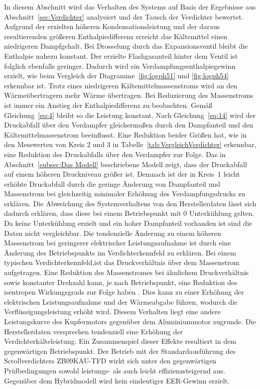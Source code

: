 In diesem Abschnitt wird das Verhalten des Systems auf Basis der Ergebnisse aus Abschnitt~\ref{sec:Verdichter} analysiert und der Tausch der Verdichter bewertet. 
Aufgrund der erzielten höheren Kondensationsleistung und der daraus resultierenden größeren Enthalpiedifferenz erreicht das Kältemittel einen niedrigeren Dampfgehalt. Bei Drosselung durch das Expansionsventil bleibt die Enthalpie nahezu konstant. Der erzielte Flashgasanteil hinter dem Ventil ist folglich ebenfalls geringer. Dadurch wird ein Verdampfungsenthalpiegewinn erzielt, wie beim Vergleich der Diagramme~\ref{fig:logph51} und \ref{fig:logph54} erkennbar ist. Trotz eines niedrigeren Kältemittelmassenstroms wird an den Wärmeübertragern mehr Wärme übertragen. Bei Reduzierung des Massenstroms ist immer ein Anstieg der Enthalpiedifferenz zu beobachten. Gemäß Gleichung~\ref{eq:4} bleibt so die Leistung konstant. \newline
Nach Gleichung~\ref{eq:14} wird der Druckabfall über den Verdampfer gleichermaßen durch den Dampfanteil und den Kältemittelmassenstrom beeinflusst. Eine Reduktion beider Größen hat, wie in den Messwerten von Kreis 2 und 3 in Tabelle~\ref{tab:VergleichVerdichter} erkennbar, eine Reduktion des Druckabfalls über den Verdampfer zur Folge. Das in Abschnitt~\ref{subsec:Das Modell} beschriebene Modell zeigt, dass der Druckabfall auf einem höheren Druckniveau größer ist. Demnach ist der in Kreis~1 leicht erhöhte Druckabfall durch die geringe Änderung von Dampfanteil und Massenstrom bei gleichzeitig minimaler Erhöhung des Verdampfungsdrucks zu erklären. \newline
Die Abweichung des Systemverhaltens von den Herstellerdaten lässt sich dadurch erklären, dass diese bei einem Betriebspunkt mit \unit{0}{\kelvin} Unterkühlung gelten. Da keine Unterkühlung erzielt und ein hoher Dampfanteil vorhanden ist sind die Daten nicht vergleichbar. Die tendenzielle Änderung zu einem höheren Massenstrom bei geringerer elektrischer Leistungsaufnahme ist durch eine Änderung des Betriebspunkts im Verdichterkennfeld zu erklären. Bei einem typischen Verdichterkennfeld,ist das Druckverhältnis über dem Massenstrom aufgetragen. Eine Reduktion des Massenstromes bei ähnlichem Druckverhältnis sowie konstanter Drehzahl kann, je nach Betriebspunkt, eine Reduktion des isentropen Wirkungsgrads zur Folge haben \cite{Wilke.2005}. 
Dies kann zu einer Erhöhung der elektrischen Leistungsaufnahme und der Wärmeabgabe führen, wodurch die Verflüssigungsleistung erhöht wird. Diesem Verhalten liegt eine andere Leistungskurve des Kupfermotors gegenüber dem Aluminiummotor zugrunde. Die Herstellerdaten versprechen tendenziell eine Erhöhung der Verdichterkälteleistung. Ein Zusammenspiel dieser Effekte resultiert in dem gegenwärtigen Betriebspunkt.  \newline
Der Betrieb mit der Standardausführung des Scrollverdichters ZB09KAU-TFD wirkt sich unter den gegenwärtigen Prüfbedingungen sowohl leistungs- als auch leicht effizienzsteigernd aus. Gegenüber dem Hybridmodell wird kein eindeutiger EER-Gewinn erzielt.


